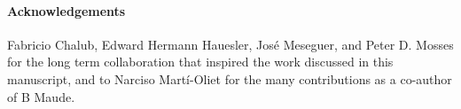 \documentclass[a4paper,openany]{book}
\begin{document}
\paragraph{Acknowledgements}
Fabricio Chalub, Edward Hermann Hauesler, Jos\'e Meseguer, and Peter D. Mosses for the long term
collaboration that inspired the work discussed in this manuscript, and to Narciso Mart\'i-Oliet for the many contributions as a co-author of B Maude.



\end{document}
